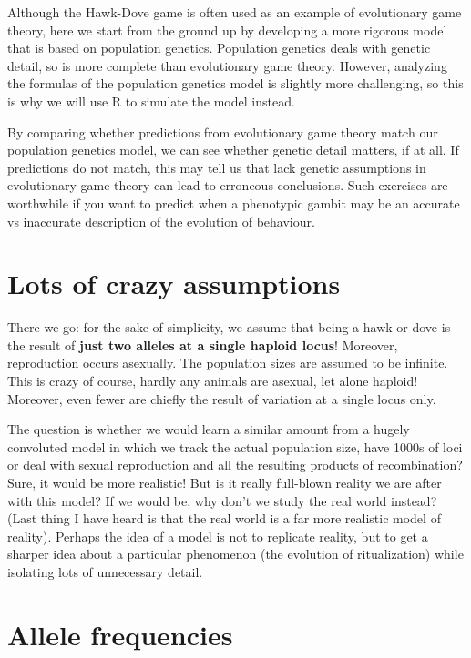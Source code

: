\documentclass[
]{book}
\begin{document}
Although the Hawk-Dove game is often used as an example of evolutionary game theory, here we start from the ground up by developing a more rigorous model that is based on population genetics. Population genetics deals with genetic detail, so is more complete than evolutionary game theory. However, analyzing the formulas of the population genetics model is slightly more challenging, so this is why we will use R to simulate the model instead.

By comparing whether predictions from evolutionary game theory match our population genetics model, we can see whether genetic detail matters, if at all. If predictions do not match, this may tell us that lack genetic assumptions in evolutionary game theory can lead to erroneous conclusions. Such exercises are worthwhile if you want to predict when a phenotypic gambit may be an accurate vs inaccurate description of the evolution of behaviour.

\section{Lots of crazy assumptions}\label{lots-of-crazy-assumptions}

There we go: for the sake of simplicity, we assume that being a hawk or dove is the result
of \textbf{just two alleles at a single haploid locus}! Moreover, reproduction occurs asexually. The population sizes are assumed to be infinite.
This is crazy of course, hardly any animals are asexual, let alone haploid! Moreover, even
fewer are chiefly the result of variation at a single locus only.

The question is whether we would learn a similar amount from a hugely convoluted model in which we track the actual population size, have 1000s of loci or deal with sexual reproduction and all the resulting products of recombination? Sure, it would be more realistic! But is it really full-blown reality we are after with this model? If we would be, why don't we study the real world instead? (Last thing I have heard is that the real world is a far more realistic model of reality). Perhaps the idea of a model is not to replicate reality, but to get a sharper idea about a particular phenomenon (the evolution of ritualization) while isolating lots of unnecessary detail.

\section{Allele frequencies}\label{allele-frequencies}
\end{document}

